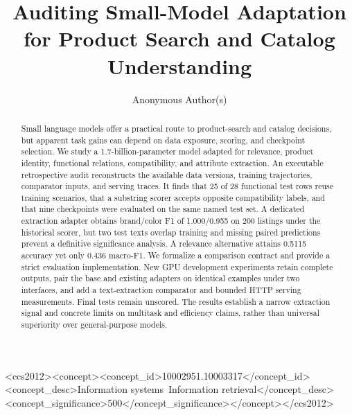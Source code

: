 \documentclass[sigconf,review,natbib=true,anonymous=true]{acmart}
\begin{document}
\title{Auditing Small-Model Adaptation for Product Search and Catalog Understanding}
\author{Anonymous Author(s)}
\begin{abstract}
Small language models offer a practical route to product-search and catalog decisions, but apparent task gains can depend on data exposure, scoring, and checkpoint selection. We study a 1.7-billion-parameter model adapted for relevance, product identity, functional relations, compatibility, and attribute extraction. An executable retrospective audit reconstructs the available data versions, training trajectories, comparator inputs, and serving traces. It finds that 25 of 28 functional test rows reuse training scenarios, that a substring scorer accepts opposite compatibility labels, and that nine checkpoints were evaluated on the same named test set. A dedicated extraction adapter obtains brand/color F1 of 1.000/0.955 on 200 listings under the historical scorer, but two test texts overlap training and missing paired predictions prevent a definitive significance analysis. A relevance alternative attains 0.5115 accuracy yet only 0.436 macro-F1. We formalize a comparison contract and provide a strict evaluation implementation. New GPU development experiments retain complete outputs, pair the base and existing adapters on identical examples under two interfaces, and add a text-extraction comparator and bounded HTTP serving measurements. Final tests remain unscored. The results establish a narrow extraction signal and concrete limits on multitask and efficiency claims, rather than universal superiority over general-purpose models.
\end{abstract}
\begin{CCSXML}
<ccs2012><concept><concept_id>10002951.10003317</concept_id><concept_desc>Information systems~Information retrieval</concept_desc><concept_significance>500</concept_significance></concept></ccs2012>
\end{CCSXML}
\maketitle

\label{end:main}

\end{document}
